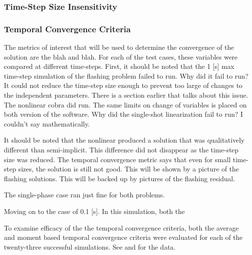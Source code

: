 \subsubsection{Time-Step Size Insensitivity}
\label{sect:result_time_step}


\subsubsection{Temporal Convergence Criteria}
\label{sect:result_temporal_convergence}


The metrics of interest that will be used to determine the convergence of the solution are the blah and blah.
For each of the test cases, these variables were compared at different time-steps.
First, it should be noted that the 1 [s] max time-step simulation of the flashing problem failed to run.
Why did it fail to run?
It could not reduce the time-step size enough to prevent too large of changes to the independent parameters.
There is a section earlier that talks about this issue.
The nonlinear cobra did run.
The same limits on change of variables is placed on both version of the software.
Why did the single-shot linearization fail to run?
I couldn't say mathematically.

It should be noted that the nonlinear \cobra produced a solution that was qualitatively different than semi-implicit.
This difference did not disappear as the time-step size was reduced.
The temporal convergence metric says that even for small time-step sizes, the solution is still not good.
This will be shown by a picture of the flashing solutions.
This will be backed up by pictures of the flashing residual.

The single-phase case ran just fine for both problems.

Moving on to the case of 0.1 [s].
In this simulation, both the

To examine efficacy of the the temporal convergence criteria, both the average and moment based temporal convergence criteria were evaluated for each of the twenty-three successful simulations.
See  and  for the data.

